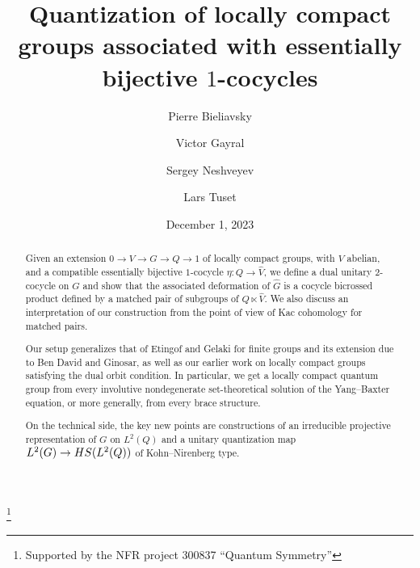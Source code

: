 \documentclass[a4paper,11pt,reqno]{amsart}
\numberwithin{equation}{section}
\theoremstyle{remark}
\theoremstyle{definition}
\newcommand\HS{{\rm HS}}
\begin{document}
\date{December 1, 2023}

\author[Bieliavsky]{Pierre Bieliavsky}
\address{Institut de Recherche en Math\'ematique et Physique, Universit\'e Catholique de Louvain, Chemin du Cyclotron, 2, 1348 Louvain-la-Neuve, Belgium}

\author[Gayral]{Victor Gayral}
\address{Laboratoire de Math\'ematiques, CNRS UMR 9008, Universit\'e de Reims Champagne-Ardenne,
Moulin de la Housse - BP 1039,
51687 Reims, France}

\author[Neshveyev]{Sergey Neshveyev}
\address{Department of Mathematics, University of Oslo,
P.O. Box 1053 Blindern, NO-0316 Oslo, Norway}
\thanks{Supported by the NFR project 300837 ``Quantum Symmetry''}

\author[Tuset]{Lars Tuset}
\address{Department of Computer Science, OsloMet - storbyuniversitetet,
P.O. Box 4 St. Olavs plass, NO-0130 Oslo, Norway}

\title{Quantization of locally compact groups associated with essentially bijective \texorpdfstring{$1$}{1}-cocycles}

\begin{abstract}
Given an extension $0\to V\to G\to Q\to1$ of locally compact groups, with $V$ abelian, and a compatible essentially bijective $1$-cocycle $\eta\colon Q\to\hat V$, we define a dual unitary $2$-cocycle on $G$ and show that the associated deformation of $\hat G$ is a cocycle bicrossed product defined by a matched pair of subgroups of $Q\ltimes\hat V$. We also discuss an interpretation of our construction from the point of view of Kac cohomology for matched pairs.

Our setup generalizes that of Etingof and Gelaki for finite groups and its extension due to Ben David and Ginosar, as well as our earlier work on locally compact groups satisfying the dual orbit condition. In particular, we get a locally compact quantum group from every involutive nondegenerate set-theoretical solution of the Yang--Baxter equation, or more generally, from every brace structure.

On the technical side, the key new points are constructions of an irreducible projective representation of $G$ on $L^2(Q)$ and a unitary quantization map $L^2(G)\to\HS(L^2(Q))$ of Kohn--Nirenberg type.
\end{abstract}

\maketitle
\end{document}
